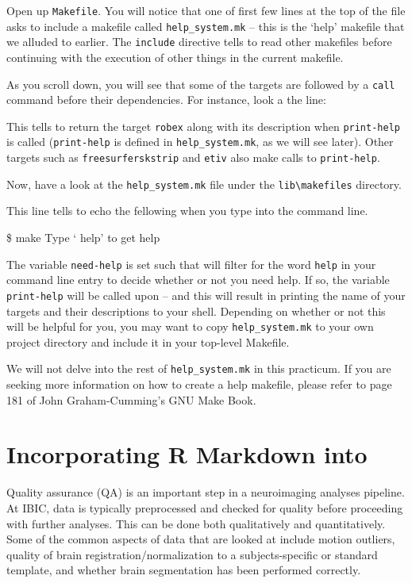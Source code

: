 Open up \texttt{Makefile}. You will notice that one of first few lines at the top of the file asks \maken{} to include a makefile called \texttt{help_system.mk} -- this is the `help' makefile that we alluded to earlier. The \texttt{include} directive tells \maken{} to read other makefiles before continuing with the execution of other things in the current makefile.  

As you scroll down, you will see that some of the targets are followed by a \texttt{call} command before their dependencies. For instance, look a the line:

This tells \maken{} to return the target \texttt{robex} along with its description when \texttt{print-help} is called (\texttt{print-help} is defined in \texttt{help_system.mk}, as we will see later). Other targets such as \texttt{freesurferskstrip} and \texttt{etiv} also make calls to \texttt{print-help}.

Now, have a look at the \texttt{help_system.mk} file under the \texttt{lib\textbackslash makefiles} directory.  

This line tells \maken{} to echo the fellowing when you type \maken{} into the command line.
\begin{bash}
\$ make
Type `\maken{} help' to get help
\end{bash}

The variable \texttt{need-help} is set such that \maken{} will filter for the word \texttt{help} in your command line entry to decide whether or not you need help. If so, the variable \texttt{print-help} will be called upon -- and this will result in \maken{} printing the name of your targets and their descriptions to your shell. Depending on whether or not this will be helpful for you, you may want to copy \texttt{help_system.mk} to your own project directory and include it in your top-level Makefile. 

We will not delve into the rest of \texttt{help_system.mk} in this practicum. If you are seeking more information on how to create a help makefile, please refer to page 181 of John Graham-Cumming's GNU Make Book. 

\section{Incorporating R Markdown into \maken{}}
Quality assurance (QA) is an important step in a neuroimaging analyses pipeline. At IBIC, data is typically  preprocessed and checked for quality before proceeding with further analyses. This can be done both qualitatively and quantitatively. Some of the common aspects of data that are looked at include motion outliers, quality of brain registration/normalization to a subjects-specific or standard template, and whether brain segmentation has been performed correctly. 

